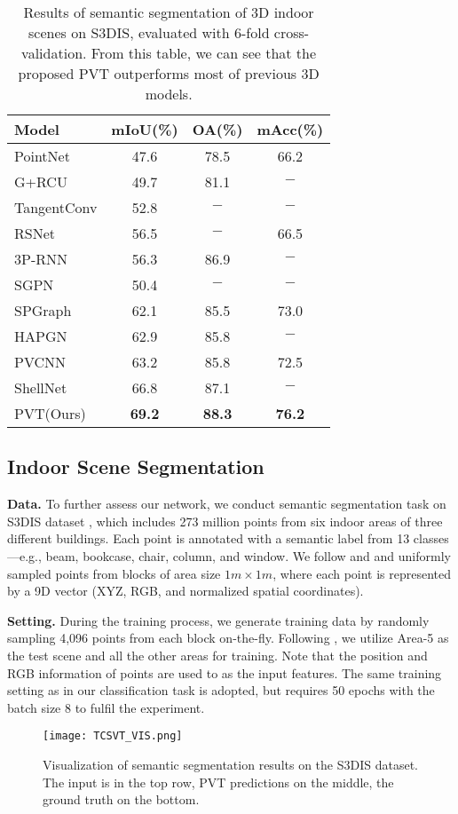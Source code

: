 \documentclass[10pt,twocolumn,letterpaper]{article}
\begin{document}
\begin{table}  
\centering
\begin{center} 
\begin{tabular}{|l|ccc|}   
\hline
Model & mIoU(\%) & OA(\%) & mAcc(\%)\\ 
\hline
PointNet & 47.6 & 78.5 & 66.2   \\
G+RCU \cite{2017Exploring} & 49.7 & 81.1 & $-$\\
TangentConv \cite{2018Tangent} & 52.8 & $-$ & $-$    \\
RSNet \cite{mehta2018rs} & 56.5 & $-$ & 66.5 \\
3P-RNN \cite{ye20183d} & 56.3 & 86.9 & $-$ \\
SGPN \cite{wang2018sgpn} & 50.4 & $-$ & $-$\\
SPGraph \cite{2018Large} & 62.1 & 85.5 & 73.0\\
HAPGN \cite{9141427} & 62.9 & 85.8 & $-$\\
PVCNN & 63.2 & 85.8 & 72.5\\
ShellNet \cite{2019ShellNet} & 66.8 & 87.1 &$-$\\
PVT(Ours) & \textbf{69.2}& \textbf{88.3} &  \textbf{76.2}\\
\hline
\end{tabular}  
\end{center}  
\caption{Results of semantic segmentation of 3D indoor scenes on S3DIS, evaluated with 6-fold cross-validation. From this table, we can see that the proposed PVT outperforms most of previous 3D models.} 
\label{6fold}
\end{table} 

\subsection{Indoor Scene Segmentation}
\textbf{Data.} To further assess our network, we conduct semantic segmentation task on S3DIS dataset \cite{DBLP:journals/corr/ArmeniSZS17}, which includes 273 million points from six indoor areas of three different buildings. Each point is annotated with a semantic label from 13 classes—e.g., beam, bookcase, chair, column, and window. We follow \cite{2017SEGCloud} and \cite{qi2017pointnet} and uniformly sampled points from blocks of area size $1m\times 1m$, where each point is represented by a 9D vector (XYZ, RGB, and normalized spatial coordinates).

\textbf{Setting. }
During the training process, we generate training data by randomly sampling
4,096 points from each block on-the-fly. Following \cite{2018Dynamic}, we utilize Area-5
as the test scene and all the other areas for training. Note that the position and RGB information of points are used to as the input features. The same training setting as in our classification task is adopted, but requires 50 epochs with the batch size 8 to fulfil the experiment.
\begin{figure*}
    \centering
    \texttt{[image: TCSVT\_VIS.png]}
    \caption{Visualization of semantic segmentation results on the S3DIS dataset. The input is in the top row, PVT predictions on the middle, the ground truth on the bottom.}
    \label{fig:vis}
\end{figure*}
\end{document}
